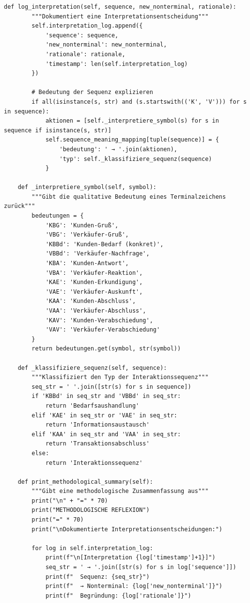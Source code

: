\documentclass[
  12pt,
  a4paper,
  oneside,
  titlepage
]{article}
\begin{document}
\begin{lstlisting}[caption=Algorithmisch Rekursive Sequenzanalyse 3.0 - Hierarchische Grammatikinduktion]
    def log_interpretation(self, sequence, new_nonterminal, rationale):
        """Dokumentiert eine Interpretationsentscheidung"""
        self.interpretation_log.append({
            'sequence': sequence,
            'new_nonterminal': new_nonterminal,
            'rationale': rationale,
            'timestamp': len(self.interpretation_log)
        })
        
        # Bedeutung der Sequenz explizieren
        if all(isinstance(s, str) and (s.startswith(('K', 'V'))) for s in sequence):
            aktionen = [self._interpretiere_symbol(s) for s in sequence if isinstance(s, str)]
            self.sequence_meaning_mapping[tuple(sequence)] = {
                'bedeutung': ' → '.join(aktionen),
                'typ': self._klassifiziere_sequenz(sequence)
            }
    
    def _interpretiere_symbol(self, symbol):
        """Gibt die qualitative Bedeutung eines Terminalzeichens zurück"""
        bedeutungen = {
            'KBG': 'Kunden-Gruß',
            'VBG': 'Verkäufer-Gruß',
            'KBBd': 'Kunden-Bedarf (konkret)',
            'VBBd': 'Verkäufer-Nachfrage',
            'KBA': 'Kunden-Antwort',
            'VBA': 'Verkäufer-Reaktion',
            'KAE': 'Kunden-Erkundigung',
            'VAE': 'Verkäufer-Auskunft',
            'KAA': 'Kunden-Abschluss',
            'VAA': 'Verkäufer-Abschluss',
            'KAV': 'Kunden-Verabschiedung',
            'VAV': 'Verkäufer-Verabschiedung'
        }
        return bedeutungen.get(symbol, str(symbol))
    
    def _klassifiziere_sequenz(self, sequence):
        """Klassifiziert den Typ der Interaktionssequenz"""
        seq_str = ' '.join([str(s) for s in sequence])
        if 'KBBd' in seq_str and 'VBBd' in seq_str:
            return 'Bedarfsaushandlung'
        elif 'KAE' in seq_str or 'VAE' in seq_str:
            return 'Informationsaustausch'
        elif 'KAA' in seq_str and 'VAA' in seq_str:
            return 'Transaktionsabschluss'
        else:
            return 'Interaktionssequenz'
    
    def print_methodological_summary(self):
        """Gibt eine methodologische Zusammenfassung aus"""
        print("\n" + "=" * 70)
        print("METHODOLOGISCHE REFLEXION")
        print("=" * 70)
        print("\nDokumentierte Interpretationsentscheidungen:")
        
        for log in self.interpretation_log:
            print(f"\n[Interpretation {log['timestamp']+1}]")
            seq_str = ' → '.join([str(s) for s in log['sequence']])
            print(f"  Sequenz: {seq_str}")
            print(f"  → Nonterminal: {log['new_nonterminal']}")
            print(f"  Begründung: {log['rationale']}")
            

\end{lstlisting}
\end{document}
